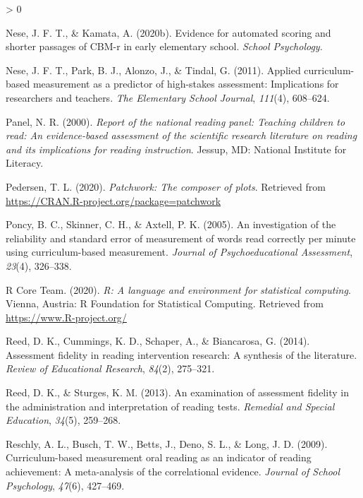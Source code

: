 \documentclass[
  english,
  man, fleqn, noextraspace]{apa6}
\newlength{\cslhangindent}
\newenvironment{CSLReferences}[2] %
 {%
  \setlength{\parindent}{0pt}
  \ifodd #1 \everypar{\setlength{\hangindent}{\cslhangindent}}\ignorespaces\fi
  \ifnum #2 > 0
  \setlength{\parskip}{#2\baselineskip}
  \fi
 }%
 {}
\begin{document}
\begin{CSLReferences}{1}{0}
\leavevmode\hypertarget{ref-nese2020asr}{}%
Nese, J. F. T., \& Kamata, A. (2020b). Evidence for automated scoring and shorter passages of CBM-r in early elementary school. \emph{School Psychology}.

\leavevmode\hypertarget{ref-nese2011}{}%
Nese, J. F. T., Park, B. J., Alonzo, J., \& Tindal, G. (2011). Applied curriculum-based measurement as a predictor of high-stakes assessment: Implications for researchers and teachers. \emph{The Elementary School Journal}, \emph{111}(4), 608--624.

\leavevmode\hypertarget{ref-readingpanel2000}{}%
Panel, N. R. (2000). \emph{Report of the national reading panel: Teaching children to read: An evidence-based assessment of the scientific research literature on reading and its implications for reading instruction}. Jessup, MD: National Institute for Literacy.

\leavevmode\hypertarget{ref-R-patchwork}{}%
Pedersen, T. L. (2020). \emph{Patchwork: The composer of plots}. Retrieved from \url{https://CRAN.R-project.org/package=patchwork}

\leavevmode\hypertarget{ref-poncy2005}{}%
Poncy, B. C., Skinner, C. H., \& Axtell, P. K. (2005). An investigation of the reliability and standard error of measurement of words read correctly per minute using curriculum-based measurement. \emph{Journal of Psychoeducational Assessment}, \emph{23}(4), 326--338.

\leavevmode\hypertarget{ref-R-base}{}%
R Core Team. (2020). \emph{R: A language and environment for statistical computing}. Vienna, Austria: R Foundation for Statistical Computing. Retrieved from \url{https://www.R-project.org/}

\leavevmode\hypertarget{ref-reed2014}{}%
Reed, D. K., Cummings, K. D., Schaper, A., \& Biancarosa, G. (2014). Assessment fidelity in reading intervention research: A synthesis of the literature. \emph{Review of Educational Research}, \emph{84}(2), 275--321.

\leavevmode\hypertarget{ref-reed2013}{}%
Reed, D. K., \& Sturges, K. M. (2013). An examination of assessment fidelity in the administration and interpretation of reading tests. \emph{Remedial and Special Education}, \emph{34}(5), 259--268.

\leavevmode\hypertarget{ref-reschly2009}{}%
Reschly, A. L., Busch, T. W., Betts, J., Deno, S. L., \& Long, J. D. (2009). Curriculum-based measurement oral reading as an indicator of reading achievement: A meta-analysis of the correlational evidence. \emph{Journal of School Psychology}, \emph{47}(6), 427--469.


\end{CSLReferences}
\end{document}
